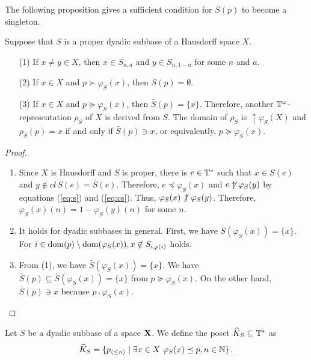 \documentclass{eptcs-modified}
\begin{document}
The following proposition gives a sufficient condition for $\bar{S}(p)$ to become a singleton.
\begin{proposition}\label{prop:rho}
  Suppose that $S$ is a proper dyadic subbase of a Hausdorff space $X$.
\begin{itemize}
\item[(1)]  If $x \ne y \in X$, then $x \in S_{n, a}$ and $y \in S_{n, 1-a}$ for some $n$ and $a$.

  \item[(2)] If $x \in X$ and $p \succ \varphi_S(x)$, then $S(p) = \emptyset$.

\item[(3)] If $x \in X$ and $p \succeq \varphi_S(x)$, then $\bar{S}(p) = \{x\}$.
Therefore,  another $\mathbb{T}^\omega$-representation  $\rho_S$ of $X$ is derived from $S$.
The domain of $\rho_S$ is $\uparrow\!\! \varphi_S(X)$ and $\rho_S(p) = x$ if and only if $ \bar{S}(p) \ni x$,
or equivalently, $p \succeq \varphi_S(x)$.
\end{itemize}
\begin{proof}
\begin{enumerate}
\item Since $X$ is Hausdorff and $S$ is proper, there is $e \in \mathbb{T}^*$ such that
$x \in S(e)$ and $y \not \in cl\, S(e) = \bar{S}(e)$.  Therefore,  $e \preceq \varphi_S(x)$ and
$e \not \uparrow \varphi_S(y)$ by equations (\ref{eq:s}) and (\ref{eq:cs}).
Thus, $\varphi_S(x) \not \,\uparrow \varphi_S(y)$.  Therefore,
$\varphi_S(x)(n) = 1- \varphi_S(y)(n)$ for some $n$.

\item  It holds for dyadic subbases in general.
First, we have $S(\varphi_S(x)) = \{x\}$.  For $i \in \operatorname{dom}(p) \setminus \operatorname{dom}(\varphi_S(x)), x \not \in S_{i,p(i)}$ holds.


\item  From (1), we have $\bar{S}(\varphi_S(x)) = \{x\}$.
We have $\bar{S}(p) \subseteq \bar{S}(\varphi_S(x)) = \{x\}$ from $p \succeq \varphi_S(x)$.
On the other hand, $\bar{S}(p) \ni x$ because $p \comp \varphi_S(x)$.
\end{enumerate}
\end{proof}
\end{proposition}





\begin{definition}
Let $S$ be a dyadic subbase of a space $\mathbf{X}$.
 We define the poset $\widehat{K}_S \subseteq \mathbb{T}^*$ as
 \[
\widehat{K}_S = \{{{p_{{\langle\leq n\rangle}}}}  \mid  \exists x \in X\ \varphi_S(x) \preceq p , n \in \mathbb{N}\}\,.
\]
\end{definition}
\end{document}
